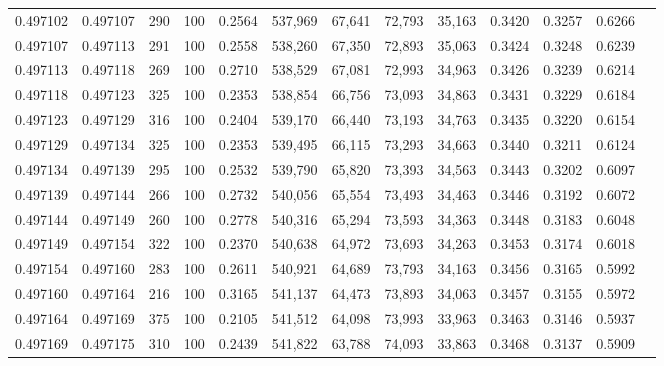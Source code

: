 \begin{tabular}{rrrrrrrrrrrrr}
0.497102 & 0.497107 &   290 & 100 &                                     0.2564 & 537,969 &  67,641 &  72,793 &  35,163 & 0.3420 & 0.3257 & 0.6266 \\
0.497107 & 0.497113 &   291 & 100 &                                     0.2558 & 538,260 &  67,350 &  72,893 &  35,063 & 0.3424 & 0.3248 & 0.6239 \\
0.497113 & 0.497118 &   269 & 100 &                                     0.2710 & 538,529 &  67,081 &  72,993 &  34,963 & 0.3426 & 0.3239 & 0.6214 \\
0.497118 & 0.497123 &   325 & 100 &                                     0.2353 & 538,854 &  66,756 &  73,093 &  34,863 & 0.3431 & 0.3229 & 0.6184 \\
0.497123 & 0.497129 &   316 & 100 &                                     0.2404 & 539,170 &  66,440 &  73,193 &  34,763 & 0.3435 & 0.3220 & 0.6154 \\
0.497129 & 0.497134 &   325 & 100 &                                     0.2353 & 539,495 &  66,115 &  73,293 &  34,663 & 0.3440 & 0.3211 & 0.6124 \\
0.497134 & 0.497139 &   295 & 100 &                                     0.2532 & 539,790 &  65,820 &  73,393 &  34,563 & 0.3443 & 0.3202 & 0.6097 \\
0.497139 & 0.497144 &   266 & 100 &                                     0.2732 & 540,056 &  65,554 &  73,493 &  34,463 & 0.3446 & 0.3192 & 0.6072 \\
0.497144 & 0.497149 &   260 & 100 &                                     0.2778 & 540,316 &  65,294 &  73,593 &  34,363 & 0.3448 & 0.3183 & 0.6048 \\
0.497149 & 0.497154 &   322 & 100 &                                     0.2370 & 540,638 &  64,972 &  73,693 &  34,263 & 0.3453 & 0.3174 & 0.6018 \\
0.497154 & 0.497160 &   283 & 100 &                                     0.2611 & 540,921 &  64,689 &  73,793 &  34,163 & 0.3456 & 0.3165 & 0.5992 \\
0.497160 & 0.497164 &   216 & 100 &                                     0.3165 & 541,137 &  64,473 &  73,893 &  34,063 & 0.3457 & 0.3155 & 0.5972 \\
0.497164 & 0.497169 &   375 & 100 &                                     0.2105 & 541,512 &  64,098 &  73,993 &  33,963 & 0.3463 & 0.3146 & 0.5937 \\
0.497169 & 0.497175 &   310 & 100 &                                     0.2439 & 541,822 &  63,788 &  74,093 &  33,863 & 0.3468 & 0.3137 & 0.5909 \\

\end{tabular}
